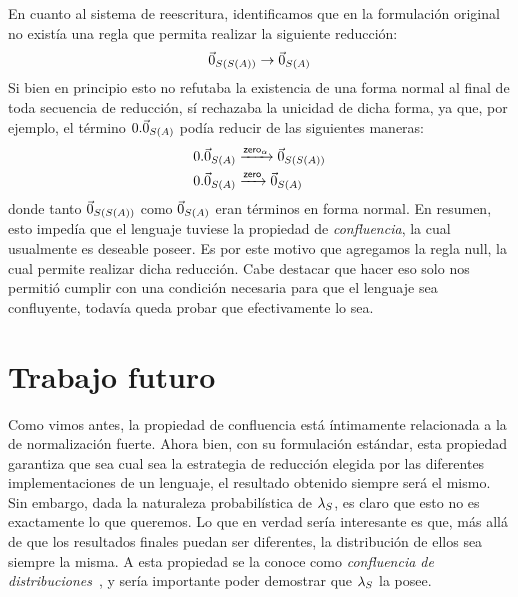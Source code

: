 En cuanto al sistema de reescritura, identificamos que en la formulación original no existía una regla que permita realizar la siguiente reducción:
\[
  \vec{0}_{S (S(A))} \rightarrow \vec{0}_{S (A)}
\]
Si bien en principio esto no refutaba la existencia de una forma normal al final de toda secuencia de reducción, sí rechazaba la unicidad de dicha forma, ya que, por ejemplo, el término \( 0 . \vec{0}_{S (A)} \) podía reducir de las siguientes maneras:
\begin{equation*}
  \begin{split}
    0 . \vec{0}_{S (A)} & \xrightarrow{\mathsf{zero}_\alpha} \vec{0}_{S (S(A))} \\
    0 . \vec{0}_{S (A)} & \xrightarrow{\mathsf{zero}} \vec{0}_{S (A)}
  \end{split}
\end{equation*}
donde tanto \( \vec{0}_{S (S(A))} \) como \( \vec{0}_{S (A)} \) eran términos en forma normal. En resumen, esto impedía que el lenguaje tuviese la propiedad de \textit{confluencia}, la cual usualmente es deseable poseer. Es por este motivo que agregamos la regla \textsf{null}, la cual permite realizar dicha reducción. Cabe destacar que hacer eso solo nos permitió cumplir con una condición necesaria para que el lenguaje sea confluyente, todavía queda probar que efectivamente lo sea.

\section{Trabajo futuro}

Como vimos antes, la propiedad de confluencia está íntimamente relacionada a la de normalización fuerte. Ahora bien, con su formulación estándar, esta propiedad garantiza que sea cual sea la estrategia de reducción elegida por las diferentes implementaciones de un lenguaje, el resultado obtenido siempre será el mismo. Sin embargo, dada la naturaleza probabilística de \( \lambda_S \), es claro que esto no es exactamente lo que queremos. Lo que en verdad sería interesante es que, más allá de que los resultados finales puedan ser diferentes, la distribución de ellos sea siempre la misma. A esta propiedad se la conoce como \textit{confluencia de distribuciones}~\cite{confluence-thesis, confluence}, y sería importante poder demostrar que \( \lambda_S \) la posee.
